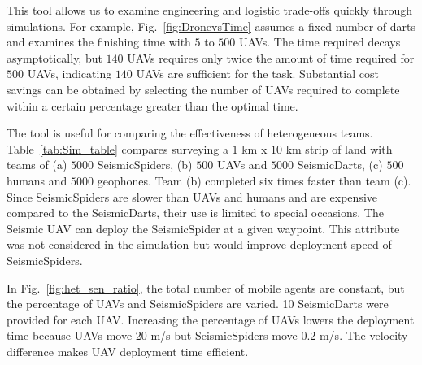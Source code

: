 This tool allows us to examine engineering and logistic trade-offs quickly through simulations.  For example, Fig.~\ref{fig:DronevsTime} assumes a fixed number of darts and examines the finishing time with $5$ to $500$ UAVs.  The time required decays asymptotically, but $140$ UAVs requires only twice the amount of time required for $500$ UAVs, indicating  $140$ UAVs are sufficient for the task.    
 Substantial cost savings can be obtained by selecting the number of UAVs required to complete within a certain percentage greater than the optimal time.

The tool is useful for comparing the effectiveness of heterogeneous teams.  Table~\ref{tab:Sim_table} compares surveying a $1$ km x $10$ km strip of land with teams of (a) $5000$ SeismicSpiders, (b) $500$ UAVs and $5000$ SeismicDarts, (c) $500$ humans and $5000$ geophones.  Team (b) completed six times faster than team (c). 
  Since SeismicSpiders are  slower than UAVs and humans and are expensive compared to the SeismicDarts, their use is limited to special occasions. The Seismic UAV can deploy the SeismicSpider at a given waypoint. This attribute was not considered in the simulation but would improve deployment speed of SeismicSpiders.
   
In Fig.~\ref{fig:het_sen_ratio}, the total number of mobile agents are constant, but the percentage of UAVs and SeismicSpiders are varied.  10 SeismicDarts were provided for each UAV. Increasing the percentage of UAVs lowers the deployment time because UAVs move 20 m/s but SeismicSpiders move 0.2 m/s. 
The velocity difference makes UAV deployment time efficient. 







